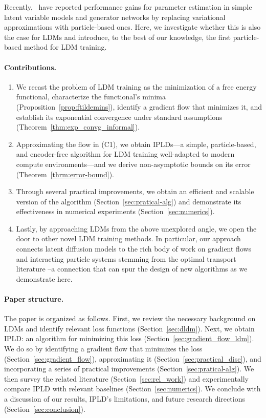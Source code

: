 \documentclass[twoside]{article}
\begin{document}
Recently,~\cite{kuntz23a,limMomentumParticleMaximum2024,limParticleSemiimplicitVariational2024} have reported performance gains for parameter estimation in simple latent variable models and generator networks by replacing variational approximations with particle-based ones. Here, we investigate whether this is also the case for \glspl*{LDM} and introduce, to the best of our knowledge, the first particle-based method for \gls*{LDM} training.



\paragraph{Contributions.} 
\begin{enumerate}[label={(C\arabic*)}]
\item We recast the problem of \gls*{LDM} training as the minimization of a free energy functional, characterize the functional's minima (Proposition~\ref{prop:ftildemins}), identify a gradient flow that minimizes it, and establish its exponential convergence under standard assumptions (Theorem~\ref{thm:exp_convg_informal}).
\item Approximating the flow in (C1), we obtain \glspl*{IPLD}---a simple, particle-based, and encoder-free algorithm for \gls*{LDM} training well-adapted to modern compute environments---and we derive non-asymptotic bounds on its error (Theorem~\ref{thrm:error-bound}).
\item Through several practical improvements, we obtain an efficient and scalable version of the algorithm (Section~\ref{sec:pratical-alg}) and demonstrate its effectiveness in numerical experiments (Section~\ref{sec:numerics}).
\item Lastly, by approaching \glspl*{LDM} from the above unexplored angle, we open the door to other novel \gls*{LDM} training methods. In particular, our approach connects latent diffusion models to the rich body of work on gradient flows and interacting particle systems stemming from the optimal transport literature \citep{villani2008optimal,chaintron_2022}--a connection that can spur the design of new algorithms as we demonstrate here.
\end{enumerate}
\paragraph{Paper structure.} The paper is organized as follows. First, we review the necessary background on \glspl*{LDM} and identify relevant loss functions (Section~\ref{sec:dldm}). Next, we obtain \gls*{IPLD}: an algorithm for minimizing this loss (Section~\ref{sec:gradient_flow_ldm}). We do so by identifying a gradient flow that minimizes the loss (Section~\ref{sec:gradient_flow}), approximating it (Section~\ref{sec:practical_disc}), and incorporating a series of practical improvements (Section~\ref{sec:pratical-alg}). We then survey the related literature (Section~\ref{sec:rel_work}) and experimentally compare \gls*{IPLD} with relevant baselines (Section~\ref{sec:numerics}). We conclude with a discussion of our results, \gls*{IPLD}'s limitations, and future research directions (Section~\ref{sec:conclusion}).
\end{document}
